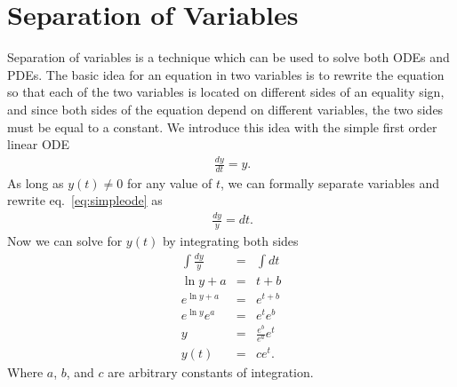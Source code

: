 \chapter{Separation of Variables}
Separation of variables is a technique which can be used to solve both ODEs and PDEs. The basic idea for an equation in two variables is to rewrite the equation so that each of the two variables is located on different sides of an equality sign, and since both sides of the equation depend on different variables, the two sides must be equal to a constant. We introduce this idea with the simple first order linear ODE
\begin{eqnarray}\label{eq:simpleode}
\ \frac{dy}{dt}=y.
\end{eqnarray}
As long as $y(t) \neq 0$ for any value of $t$, we can formally separate variables and rewrite eq.\ \eqref{eq:simpleode} as
\begin{eqnarray}
\ \frac{dy}{y}=dt.
\end{eqnarray}
Now we can solve for $y(t)$ by integrating both sides
\begin{eqnarray}
\int{\frac{dy}{y}}&=&\int{dt} \\
\ln{y}+a&=&t+b \\
e^{\ln{y}+a}&=&e^{t+b} \\
e^{\ln{y}}e^{a}&=&e^te^b \\
y&=&\frac{e^b}{e^a} e^t \\
y(t)&=&c e^t.
\end{eqnarray}
Where $a$, $b$, and $c$ are arbitrary constants of integration. 

